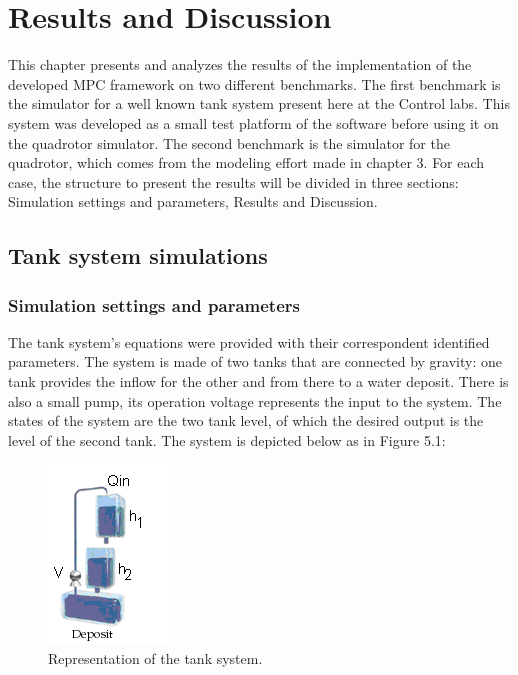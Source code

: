 \chapter{Results and Discussion}
\label{chap:Results_and_Discussion}

This chapter presents and analyzes the results of the implementation of the developed MPC framework on two different benchmarks. The first benchmark is the simulator for a well known tank system present here at the Control labs. This system was developed as a small test platform of the software before using it on the quadrotor simulator. The second benchmark is the simulator for the quadrotor, which comes from the modeling effort made in chapter 3. For each case, the structure to present the results will be divided in three sections: Simulation settings and parameters, Results and Discussion.

\section{Tank system simulations}

\subsection{Simulation settings and parameters}

The tank system's equations were provided with their correspondent identified parameters. The system is made of two tanks that are connected by gravity: one tank provides the inflow for the other and from there to a water deposit. There is also a small pump, its operation voltage represents the input to the system. The states of the system are the two tank level, of which the desired output is the level of the second  tank.  The system is depicted below as in Figure 5.1: 

\begin{figure}[H]
\centering
\includegraphics[scale=0.7]{Images/Chapter5/tank_system.png}
\caption{Representation of the tank system.}
\label{fig:tank_system}
\end{figure}

